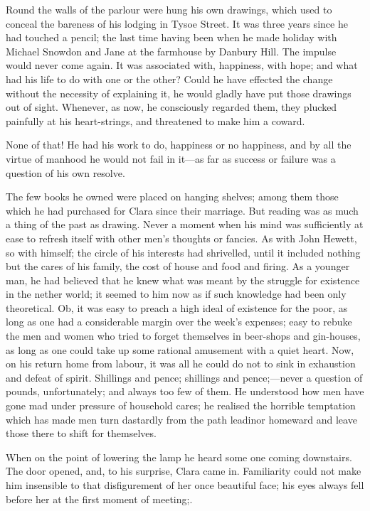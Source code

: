 Round the walls of the parlour were hung his own drawings, which used to
conceal the bareness of his lodging in Tysoe Street. It was
{\protect\hypertarget{273}{}{}}three years since he had touched a
pencil; the last time having been when he made holiday with Michael
Snowdon and Jane at the farmhouse by Danbury Hill. The impulse would
never come again. It was associated with, happiness, with hope; and what
had his life to do with one or the other? Could he have effected the
change without the necessity of explaining it, he would gladly have put
those drawings out of sight. Whenever, as now, he consciously regarded
them, they plucked painfully at his heart-strings, and threatened to
make him a coward.

None of that! He had his work to do, happiness or no happiness, and by
all the virtue of manhood he would not fail in it---as far as success or
failure was a question of his own resolve.

The few books he owned were placed on hanging shelves; among them those
which he had purchased for Clara since their marriage. But reading was
as much a thing of the past as drawing. Never a moment when his mind was
sufficiently at ease to refresh itself with other men's thoughts or
fancies. As with John Hewett, so with himself; the circle of
{\protect\hypertarget{274}{}{}}his interests had shrivelled, until it
included nothing but the cares of his family, the cost of house and food
and firing. As a younger man, he had believed that he knew what was
meant by the struggle for existence in the nether world; it seemed to
him now as if such knowledge had been only theoretical. Ob, it was easy
to preach a high ideal of existence for the poor, as long as one had a
considerable margin over the week's expenses; easy to rebuke the men and
women who tried to forget themselves in beer-shops and gin-houses, as
long as one could take up some rational amusement with a quiet heart.
Now, on his return home from labour, it was all he could do not to sink
in exhaustion and defeat of spirit. Shillings and pence; shillings and
pence;---never a question of pounds, unfortunately; and always too few
of them. He understood how men have gone mad under pressure of household
cares; he realised the horrible temptation which has made men turn
dastardly from the path leadinor homeward and leave those there to shift
for themselves.

When on the point of lowering the lamp he heard some one coming
downstairs. The {\protect\hypertarget{275}{}{}}door opened, and, to his
surprise, Clara came in. Familiarity could not make him insensible to
that disfigurement of her once beautiful face; his eyes always fell
before her at the first moment of meeting;.

